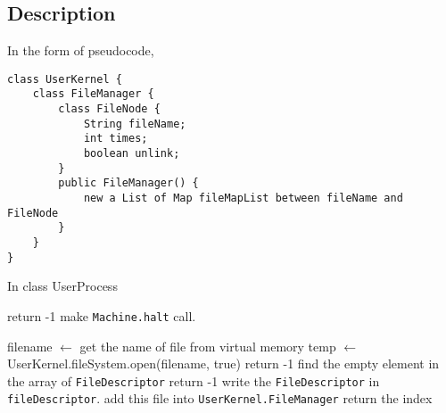 \documentclass{article}
\begin{document}
\subsection{Description}
In the form of pseudocode,
\begin{lstlisting}
class UserKernel {
	class FileManager {
		class FileNode {
			String fileName;
			int times;
			boolean unlink;
		}
		public FileManager() {
			new a List of Map fileMapList between fileName and FileNode
		}
	}
}
\end{lstlisting}
\begin{algorithm}
		\caption{In class UserProcess}
    \begin{algorithmic}
                \State return -1
            \EndIf
						\State make \texttt{Machine.halt} call.
        \EndProcedure
    \end{algorithmic}
    \begin{algorithmic}
            \State filename $\leftarrow$ get the name of file from virtual memory
            \State temp $\leftarrow$ UserKernel.fileSystem.open(filename, true)
                \State return -1
            \Else
                \State find the empty element in the array of \texttt{FileDescriptor}
                    \State return -1
                \Else
									\State write the \texttt{FileDescriptor} in \texttt{fileDescriptor}.
									\State add this file into \texttt{UserKernel.FileManager}
                   \State return the index
                \EndIf
            \EndIf
        \EndProcedure
    \end{algorithmic}
\end{algorithm}
\end{document}
